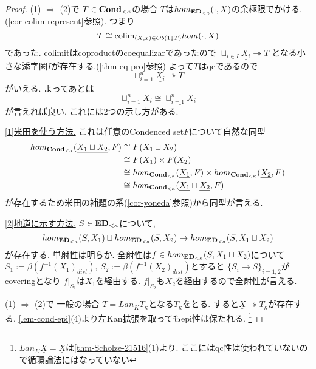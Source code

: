 \documentclass[dvipdfmx,a4paper,11pt]{report}
\newcommand{\colim}{{\rm colim}}
\theoremstyle{definition}
\begin{document}
 \begin{proof}

\underline{ (1) $\Rightarrow$ (2)で $T \in {\bf Cond}_{< \kappa}$の場合 }
$T$は$hom_{{\bf ED}_{<\kappa}}(\cdot, X)$の余極限でかける.
(\ref{cor-colim-represent}参照). つまり
 $$
 T \cong  \colim_{(X,x) \in Ob(1 \downarrow T)} hom(\cdot, X)
 $$
 であった.
 colimitはcoproductのcoequalizarであったので
 $\sqcup_{i \in I}\underline{X_i} \twoheadrightarrow T $
 となる小さな添字圏$I$が存在する.(\ref{thm-eq-pro}参照)
よって$T$はqcであるので
$$
\sqcup_{i=1}^{n}\underline{X_i} \twoheadrightarrow T 
$$ 
がいえる.
よってあとは
$$
\sqcup_{i=1}^{n}\underline{X_i}
\cong 
\underline{\sqcup_{i=1}^{n} X_i}
$$
が言えれば良い.
これには2つの示し方がある. 

\underline{[1]米田を使う方法.} これは任意のCondenced set$F$について自然な同型
\begin{align*}
\begin{split}
hom_{{\bf Cond}_{< \kappa}}(\underline{X_1 \sqcup X_2}, F)
& \cong  F(X_1 \sqcup X_2) \\
& \cong F(X_1) \times F(X_2) \\
& \cong hom_{{\bf Cond}_{< \kappa}} (\underline{X_1}, F)\times hom_{{\bf Cond}_{< \kappa}}(\underline{X_2}, F) \\
& \cong hom_{{\bf Cond}_{< \kappa}}(\underline{X_1}\sqcup \underline{X_2}, F) \\
\end{split}
\end{align*}
が存在するため米田の補題の系(\ref{cor-yoneda}参照)から同型が言える. 

\underline{[2]地道に示す方法.} $S \in {\bf ED}_{<\kappa}$について, 
$$
hom_{{\bf ED}_{< \kappa}}(S, X_1) \sqcup hom_{{\bf ED}_{< \kappa}}(S, X_2) \to  hom_{{\bf ED}_{< \kappa}}(S, X_1 \sqcup X_2)
$$
が存在する. 単射性は明らか. 
全射性は$f \in hom_{{\bf ED}_{< \kappa}}(S, X_1 \sqcup X_2)$について$S_1 := \beta(f^{-1}(X_1)_{dist})$, $S_2 := \beta(f^{-1}(X_2)_{dist})$とすると
$\{S_i \to S\}_{i=1,2}$がcoveringとなり
$f|_{S_{1}}$は$X_1$を経由する. $f|_{S_{2}}$も$X_2$を経由するので全射性が言える.

\underline{(1) $\Rightarrow$ (2)で 一般の場合 }
$T = Lan_{K}T_{\kappa}$となる$T_{\kappa}$をとる.
すると$\underline{X} \twoheadrightarrow T_{\kappa}$が存在する.
\ref{lem-cond-epi}(4)より左Kan拡張を取ってもepi性は保たれる. 
\footnote{$Lan_{K}\underline{X}=\underline{X}$は\ref{thm-Scholze-21516}(1)より. ここにはqc性は使われていないので循環論法にはなっていない}


\end{proof}
\end{document}
